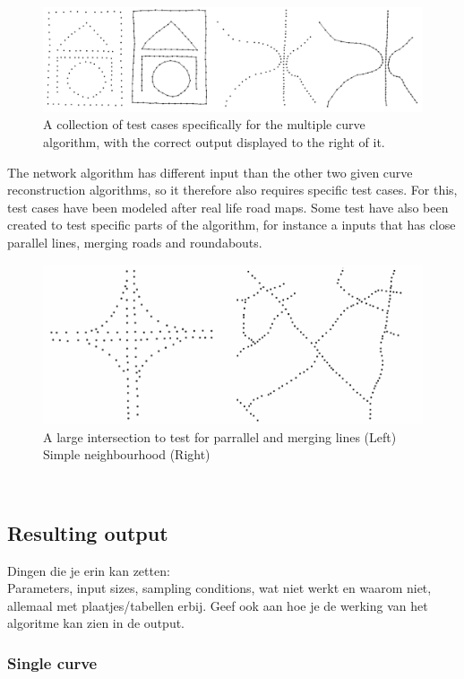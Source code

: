 \documentclass[11pt]{article}
\begin{document}
\begin{figure}[ht!]
\centering
\includegraphics[scale=0.3]{multiInput.png}
\caption{A collection of test cases specifically for the multiple curve algorithm, with the correct output displayed to the right of it.}
\label{multi}
\end{figure}

The network algorithm has different input than the other two given curve reconstruction algorithms, so it therefore also requires specific test cases. For this, test cases have been modeled after real life road maps. Some test have also been created to test specific parts of the algorithm, for instance a inputs that has close parallel lines, merging roads and roundabouts.

\begin{figure}[ht!]
\centering
\includegraphics[scale=0.3]{networkInput.png}
\caption{A large intersection to test for parrallel and merging lines (Left) Simple neighbourhood (Right)}
\label{network}
\end{figure}$ $\\

\subsection{Resulting output}
Dingen die je erin kan zetten:\\
Parameters, input sizes, sampling conditions, wat niet werkt en waarom niet, allemaal met plaatjes/tabellen erbij. Geef ook aan hoe je de werking van het algoritme kan zien in de output.

\subsubsection{Single curve}
\end{document}
